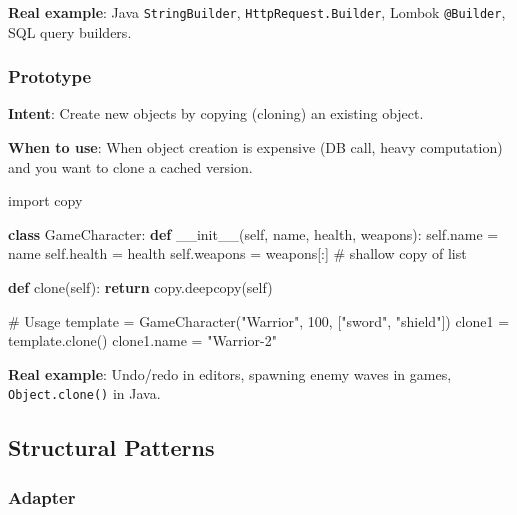\documentclass[11pt]{article}
\newenvironment{Shaded}{\begin{snugshade}}{\end{snugshade}}
\newcommand{\CommentTok}[1]{\textcolor[rgb]{0.48,0.49,0.49}{#1}}
\newcommand{\ControlFlowTok}[1]{\textcolor[rgb]{0.99,0.74,0.29}{\textbf{#1}}}
\newcommand{\DecValTok}[1]{\textcolor[rgb]{0.96,0.45,0.00}{#1}}
\newcommand{\FunctionTok}[1]{\textcolor[rgb]{0.56,0.27,0.68}{#1}}
\newcommand{\ImportTok}[1]{\textcolor[rgb]{0.15,0.68,0.38}{#1}}
\newcommand{\KeywordTok}[1]{\textcolor[rgb]{0.81,0.81,0.76}{\textbf{#1}}}
\newcommand{\NormalTok}[1]{\textcolor[rgb]{0.81,0.81,0.76}{#1}}
\newcommand{\OperatorTok}[1]{\textcolor[rgb]{0.81,0.81,0.76}{#1}}
\newcommand{\StringTok}[1]{\textcolor[rgb]{0.96,0.31,0.31}{#1}}
\newcommand{\VariableTok}[1]{\textcolor[rgb]{0.15,0.68,0.68}{#1}}
\begin{document}
\textbf{Real example}: Java \texttt{StringBuilder}, \texttt{HttpRequest.Builder}, Lombok \texttt{@Builder}, SQL query builders.

\subsubsection{Prototype}\label{prototype}

\textbf{Intent}: Create new objects by copying (cloning) an existing object.

\textbf{When to use}: When object creation is expensive (DB call, heavy computation) and you want to clone a cached version.


\begin{Shaded}
\begin{Highlighting}[]
\ImportTok{import}\NormalTok{ copy}

\KeywordTok{class}\NormalTok{ GameCharacter:}
    \KeywordTok{def} \FunctionTok{\_\_init\_\_}\NormalTok{(}\VariableTok{self}\NormalTok{, name, health, weapons):}
        \VariableTok{self}\NormalTok{.name }\OperatorTok{=}\NormalTok{ name}
        \VariableTok{self}\NormalTok{.health }\OperatorTok{=}\NormalTok{ health}
        \VariableTok{self}\NormalTok{.weapons }\OperatorTok{=}\NormalTok{ weapons[:]  }\CommentTok{\# shallow copy of list}

    \KeywordTok{def}\NormalTok{ clone(}\VariableTok{self}\NormalTok{):}
        \ControlFlowTok{return}\NormalTok{ copy.deepcopy(}\VariableTok{self}\NormalTok{)}

\CommentTok{\# Usage}
\NormalTok{template }\OperatorTok{=}\NormalTok{ GameCharacter(}\StringTok{"Warrior"}\NormalTok{, }\DecValTok{100}\NormalTok{, [}\StringTok{"sword"}\NormalTok{, }\StringTok{"shield"}\NormalTok{])}
\NormalTok{clone1 }\OperatorTok{=}\NormalTok{ template.clone()}
\NormalTok{clone1.name }\OperatorTok{=} \StringTok{"Warrior{-}2"}
\end{Highlighting}
\end{Shaded}

\textbf{Real example}: Undo/redo in editors, spawning enemy waves in games, \texttt{Object.clone()} in Java.

\subsection{Structural Patterns}\label{structural-patterns}

\subsubsection{Adapter}\label{adapter}
\end{document}
